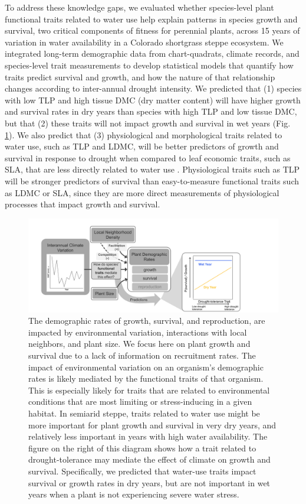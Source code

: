 \documentclass[12pt, letterpaper]{article}
\begin{document}
To address these knowledge gaps, we evaluated whether species-level plant functional traits related to water use help explain patterns in species growth and survival, two critical components of fitness for perennial plants, across 15 years of variation in water availability in a Colorado shortgrass steppe ecosystem. We integrated long-term demographic data from chart-quadrats, climate records, and species-level trait measurements to develop statistical models that quantify how traits predict survival and growth, and how the nature of that relationship changes according to inter-annual drought intensity. We predicted that (1) species with low TLP and high tissue DMC (dry matter content) will have higher growth and survival rates in dry years than species with high TLP and low tissue DMC, but that (2) these traits will not impact growth and survival in wet years (Fig. \ref{fig:ConceptFig}). We also predict that (3) physiological and morphological traits related to water use, such as TLP and LDMC, will be better predictors of growth and survival in response to drought when compared to leaf economic traits, such as SLA, that are less directly related to water use \cite{Wright2004, Reich2014}. Physiological traits such as TLP will be stronger predictors of survival than easy-to-measure functional traits such as LDMC or SLA, since they are more direct measurements of physiological processes that impact growth and survival. 
\begin{figure}
\includegraphics[width=1\textwidth]{CO_sgs_ConceptualFigure.pdf}
\caption{\internallinenumbers\small{
The demographic rates of growth, survival, and reproduction, are impacted by environmental variation, interactions with local neighbors, and plant size. We focus here on plant growth and survival due to a lack of information on recruitment rates. The impact of environmental variation on an organism's demographic rates is likely mediated by the functional traits of that organism. This is especially likely for traits that are related to environmental conditions that are most limiting or stress-inducing in a given habitat. In semiarid steppe, traits related to water use might be more important for plant growth and survival in very dry years, and relatively less important in years with high water availability. The figure on the right of this diagram shows how a trait related to drought-tolerance may mediate the effect of climate on growth and survival. Specifically, we predicted that water-use traits impact survival or growth rates in dry years, but are not important in wet years when a plant is not experiencing severe water stress. 
}}
\label{fig:ConceptFig}
\end{figure}
\end{document}
